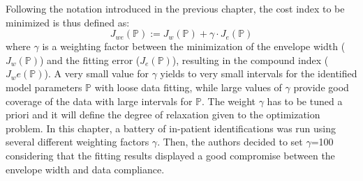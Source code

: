 	
%
%	

Following the notation introduced in the previous chapter, the cost index to be minimized is thus defined as:
\begin{equation}
	J_{we} (\mathbb{P}):=J_w (\mathbb{P})+\gamma \cdot J_e (\mathbb{P})		
\label{eq:JWE}
\end{equation}
where $\gamma$ is a weighting factor between the minimization of the envelope width ($J_w (\mathbb{P})$) and the fitting error ($J_e (\mathbb{P})$), resulting in the compound index ($J_we (\mathbb{P})$). A very small value for $\gamma$ yields to very small intervals for the identified model parameters $\mathbb{P}$ with loose data fitting, while large values of $\gamma$ provide good coverage of the data with large intervals for $\mathbb{P}$. The weight $\gamma$ has to be tuned a priori and it will define the degree of relaxation given to the optimization problem. In this chapter, a battery of in-patient identifications was run using several different weighting factors $\gamma$. Then, the authors decided to set $\gamma$=100 considering that the fitting results displayed a good compromise between the envelope width and data compliance.


